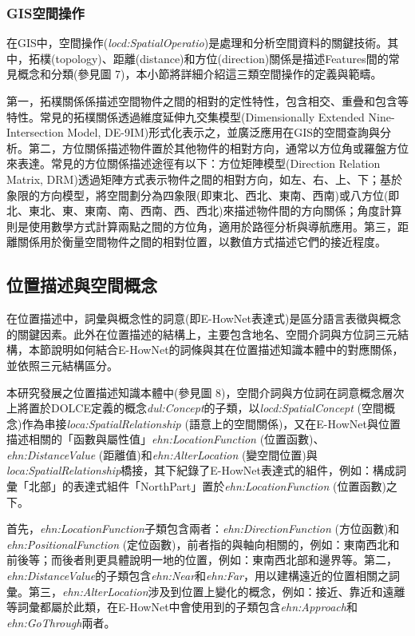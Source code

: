 % 

\subsubsection{GIS空間操作}

在GIS中，空間操作(\textit{locd:SpatialOperatio})是處理和分析空間資料的關鍵技術。其中，拓樸(topology)、距離(distance)和方位(direction)關係是描述Features間的常見概念和分類(參見圖 7)，本小節將詳細介紹這三類空間操作的定義與範疇。

第一，拓樸關係係描述空間物件之間的相對的定性特性，包含相交、重疊和包含等特性。常見的拓樸關係透過維度延伸九交集模型(Dimensionally Extended Nine-Intersection Model, DE-9IM)形式化表示之，並廣泛應用在GIS的空間查詢與分析。第二，方位關係描述物件置於其他物件的相對方向，通常以方位角或羅盤方位來表達。常見的方位關係描述途徑有以下：方位矩陣模型(Direction Relation Matrix, DRM)透過矩陣方式表示物件之間的相對方向，如左、右、上、下\citep{RN183}；基於象限的方向模型，將空間劃分為四象限(即東北、西北、東南、西南)或八方位(即北、東北、東、東南、南、西南、西、西北)來描述物件間的方向關係；角度計算則是使用數學方式計算兩點之間的方位角，適用於路徑分析與導航應用。第三，距離關係用於衡量空間物件之間的相對位置，以數值方式描述它們的接近程度。

\subsection{位置描述與空間概念}

在位置描述中，詞彙與概念性的詞意(即E-HowNet表達式)是區分語言表徵與概念的關鍵因素。此外在位置描述的結構上，主要包含地名、空間介詞與方位詞三元結構，本節說明如何結合E-HowNet的詞條與其在位置描述知識本體中的對應關係，並依照三元結構區分。

本研究發展之位置描述知識本體中(參見圖 8)，空間介詞與方位詞在詞意概念層次上將置於DOLCE定義的概念\textit{dul:Concept}的子類，以\textit{locd:SpatialConcept} (空間概念)作為串接\textit{loca:SpatialRelationship} (語意上的空間關係)，又在E-HowNet與位置描述相關的「函數與屬性值」\textit{ehn:LocationFunction} (位置函數)、\textit{ehn:DistanceValue} (距離值)和\textit{ehn:AlterLocation} (變空間位置)與\textit{loca:SpatialRelationship}橋接，其下紀錄了E-HowNet表達式的組件，例如：構成詞彙「北部」的表達式組件「NorthPart」置於\textit{ehn:LocationFunction} (位置函數)之下。

首先，\textit{ehn:LocationFunction}子類包含兩者：\textit{ehn:DirectionFunction} (方位函數)和\textit{ehn:PositionalFunction} (定位函數)，前者指的與軸向相關的，例如：東南西北和前後等；而後者則更具體說明一地的位置，例如：東南西北部和邊界等。第二，\textit{ehn:DistanceValue}的子類包含\textit{ehn:Near}和\textit{ehn:Far}，用以建構遠近的位置相關之詞彙。第三，\textit{ehn:AlterLocation}涉及到位置上變化的概念，例如：接近、靠近和遠離等詞彙都屬於此類，在E-HowNet中會使用到的子類包含\textit{ehn:Approach}和\textit{ehn:GoThrough}兩者。

